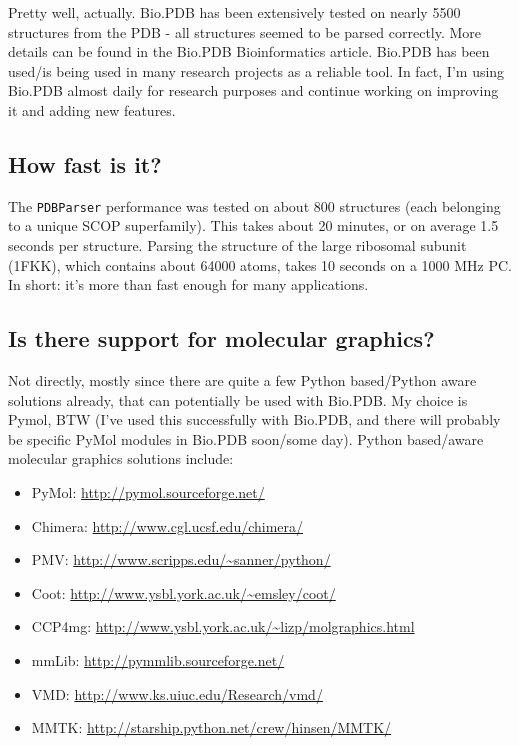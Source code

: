 Pretty well, actually. Bio.PDB has been extensively tested on nearly
5500 structures from the PDB - all structures seemed to be parsed
correctly. More details can be found in the Bio.PDB Bioinformatics
article. Bio.PDB has been used/is being used in many research projects
as a reliable tool. In fact, I'm using Bio.PDB almost daily for research
purposes and continue working on improving it and adding new features.

\subsection{How fast is it?}

The \texttt{PDBParser} performance was tested on about 800 structures
(each belonging to a unique SCOP superfamily). This takes about 20
minutes, or on average 1.5 seconds per structure. Parsing the structure
of the large ribosomal subunit (1FKK), which contains about 64000
atoms, takes 10 seconds on a 1000 MHz PC. In short: it's more than
fast enough for many applications.

\subsection{Is there support for molecular graphics?}

Not directly, mostly since there are quite a few Python based/Python
aware solutions already, that can potentially be used with Bio.PDB.
My choice is Pymol, BTW (I've used this successfully with Bio.PDB,
and there will probably be specific PyMol modules in Bio.PDB soon/some
day). Python based/aware molecular graphics solutions include:

\begin{itemize}
\item PyMol: \url{http://pymol.sourceforge.net/}
\item Chimera: \url{http://www.cgl.ucsf.edu/chimera/}
\item PMV: \url{http://www.scripps.edu/~sanner/python/}
\item Coot: \url{http://www.ysbl.york.ac.uk/~emsley/coot/}
\item CCP4mg: \url{http://www.ysbl.york.ac.uk/~lizp/molgraphics.html}
\item mmLib: \url{http://pymmlib.sourceforge.net/}
\item VMD: \url{http://www.ks.uiuc.edu/Research/vmd/}
\item MMTK: \url{http://starship.python.net/crew/hinsen/MMTK/}
\end{itemize}

